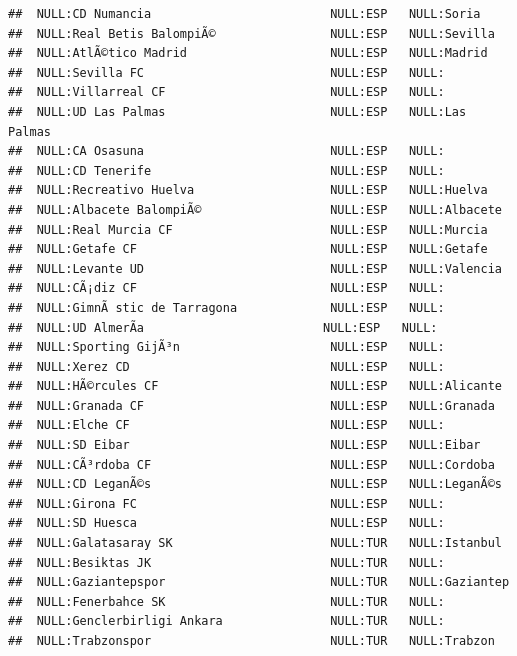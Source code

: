 \documentclass{article}\usepackage[]{graphicx}\usepackage[]{color}
\makeatletter
\newenvironment{kframe}{%
 \def\at@end@of@kframe{}%
 \ifinner\ifhmode%
  \def\at@end@of@kframe{\end{minipage}}%
  \begin{minipage}{\columnwidth}%
 \fi\fi%
 \def\FrameCommand##1{\hskip\@totalleftmargin \hskip-\fboxsep
 \colorbox{shadecolor}{##1}\hskip-\fboxsep
     \hskip-\linewidth \hskip-\@totalleftmargin \hskip\columnwidth}%
 \MakeFramed {\advance\hsize-\width
   \@totalleftmargin\z@ \linewidth\hsize
   \@setminipage}}%
 {\par\unskip\endMakeFramed%
 \at@end@of@kframe}
\newenvironment{knitrout}{}{} %
\makeatother
\begin{document}
\begin{knitrout}
\begin{kframe}
\begin{verbatim}
##  NULL:CD Numancia                         NULL:ESP   NULL:Soria                
##  NULL:Real Betis BalompiÃ©                NULL:ESP   NULL:Sevilla              
##  NULL:AtlÃ©tico Madrid                    NULL:ESP   NULL:Madrid               
##  NULL:Sevilla FC                          NULL:ESP   NULL:                     
##  NULL:Villarreal CF                       NULL:ESP   NULL:                     
##  NULL:UD Las Palmas                       NULL:ESP   NULL:Las Palmas           
##  NULL:CA Osasuna                          NULL:ESP   NULL:                     
##  NULL:CD Tenerife                         NULL:ESP   NULL:                     
##  NULL:Recreativo Huelva                   NULL:ESP   NULL:Huelva               
##  NULL:Albacete BalompiÃ©                  NULL:ESP   NULL:Albacete             
##  NULL:Real Murcia CF                      NULL:ESP   NULL:Murcia               
##  NULL:Getafe CF                           NULL:ESP   NULL:Getafe               
##  NULL:Levante UD                          NULL:ESP   NULL:Valencia             
##  NULL:CÃ¡diz CF                           NULL:ESP   NULL:                     
##  NULL:GimnÃ stic de Tarragona             NULL:ESP   NULL:                     
##  NULL:UD AlmerÃ­a                         NULL:ESP   NULL:                     
##  NULL:Sporting GijÃ³n                     NULL:ESP   NULL:                     
##  NULL:Xerez CD                            NULL:ESP   NULL:                     
##  NULL:HÃ©rcules CF                        NULL:ESP   NULL:Alicante             
##  NULL:Granada CF                          NULL:ESP   NULL:Granada              
##  NULL:Elche CF                            NULL:ESP   NULL:                     
##  NULL:SD Eibar                            NULL:ESP   NULL:Eibar                
##  NULL:CÃ³rdoba CF                         NULL:ESP   NULL:Cordoba              
##  NULL:CD LeganÃ©s                         NULL:ESP   NULL:LeganÃ©s             
##  NULL:Girona FC                           NULL:ESP   NULL:                     
##  NULL:SD Huesca                           NULL:ESP   NULL:                     
##  NULL:Galatasaray SK                      NULL:TUR   NULL:Istanbul             
##  NULL:Besiktas JK                         NULL:TUR   NULL:                     
##  NULL:Gaziantepspor                       NULL:TUR   NULL:Gaziantep            
##  NULL:Fenerbahce SK                       NULL:TUR   NULL:                     
##  NULL:Genclerbirligi Ankara               NULL:TUR   NULL:                     
##  NULL:Trabzonspor                         NULL:TUR   NULL:Trabzon              

\end{verbatim}
\end{kframe}
\end{knitrout}
\end{document}

